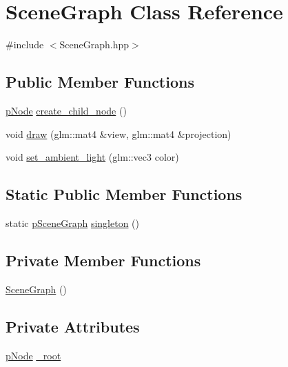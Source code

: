 \hypertarget{classSceneGraph}{}\section{Scene\+Graph Class Reference}
\label{classSceneGraph}


{\ttfamily \#include $<$Scene\+Graph.\+hpp$>$}

\subsection*{Public Member Functions}
\begin{DoxyCompactItemize}
\item 
\hyperlink{Node_8hpp_ac189bcbe7762c82a1a30c219d6ebdf75}{p\+Node} \hyperlink{classSceneGraph_acbfb3a25078b31f41a2373bf2f7747ae}{create\+\_\+child\+\_\+node} ()
\item 
void \hyperlink{classSceneGraph_a02138d9b44c12b1998141f7890421aee}{draw} (glm\+::mat4 \&view, glm\+::mat4 \&projection)
\item 
void \hyperlink{classSceneGraph_af16410fa90b4739b5d26a424d7857713}{set\+\_\+ambient\+\_\+light} (glm\+::vec3 color)
\end{DoxyCompactItemize}
\subsection*{Static Public Member Functions}
\begin{DoxyCompactItemize}
\item 
static \hyperlink{SceneGraph_8hpp_a12ad25ef584ef693808fd28bbff29c81}{p\+Scene\+Graph} \hyperlink{classSceneGraph_a3cd0423e853a2f8ea5ef59a1423f163b}{singleton} ()
\end{DoxyCompactItemize}
\subsection*{Private Member Functions}
\begin{DoxyCompactItemize}
\item 
\hyperlink{classSceneGraph_a10cb00465716a38ceff196f9ee220620}{Scene\+Graph} ()
\end{DoxyCompactItemize}
\subsection*{Private Attributes}
\begin{DoxyCompactItemize}
\item 
\hyperlink{Node_8hpp_ac189bcbe7762c82a1a30c219d6ebdf75}{p\+Node} \hyperlink{classSceneGraph_ad037f8ab479fb89e75a4648b71ec5a4a}{\+\_\+root}
\end{DoxyCompactItemize}
